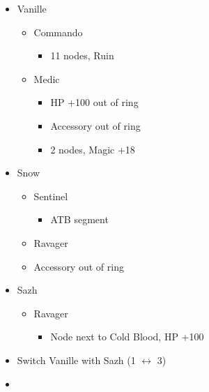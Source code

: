 \documentclass{report}
\begin{document}
\begin{menu}
\begin{itemize}
    \crystarium
    \begin{itemize}
        \item Vanille
        \begin{itemize}
            \item Commando
            \begin{itemize}
                \item 11 nodes, Ruin
            \end{itemize}
            \item Medic
            \begin{itemize}
                \item HP +100 out of ring
                \item Accessory out of ring
                \item 2 nodes, Magic +18
            \end{itemize}
        \end{itemize}
        \item Snow
        \begin{itemize}
            \item Sentinel
            \begin{itemize}
                \item ATB segment
            \end{itemize}
            \item Ravager
            \item Accessory out of ring
        \end{itemize}
        \item Sazh
        \begin{itemize}
            \item Ravager
            \begin{itemize}
                \item Node next to Cold Blood, HP +100
            \end{itemize}
        \end{itemize}
    \end{itemize}
    \paradigm
    \begin{itemize}
        \item Switch Vanille with Sazh (1 $\leftrightarrow$ 3)
        \item {}%
{\paradigmline{\com}{(\com)}{(\com)}}%
{\paradigmline{\textit{\com}}{\textit{(\com)}}{\textit{(\com)}}}%

\end{itemize}
\end{itemize}
\end{menu}
\end{document}
